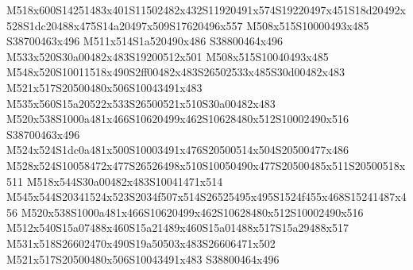 \documentclass{article}
\begin{document}
\begin{multicols}{2}
M518x600S14251483x401S11502482x432S11920491x574S19220497x451S18d20492x528S1dc20488x475S14a20497x509S17620496x557 M508x515S10000493x485 S38700463x496 M511x514S1a520490x486 S38800464x496 M533x520S30a00482x483S19200512x501 M508x515S10040493x485 M548x520S10011518x490S2ff00482x483S26502533x485S30d00482x483 M521x517S20500480x506S10043491x483 M535x560S15a20522x533S26500521x510S30a00482x483 M520x538S1000a481x466S10620499x462S10628480x512S10002490x516 S38700463x496 M524x524S1dc0a481x500S10003491x476S20500514x504S20500477x486 M528x524S10058472x477S26526498x510S10050490x477S20500485x511S20500518x511 M518x544S30a00482x483S10041471x514 M545x544S20341524x523S2034f507x514S26525495x495S1524f455x468S15241487x456 M520x538S1000a481x466S10620499x462S10628480x512S10002490x516 M512x540S15a07488x460S15a21489x460S15a01488x517S15a29488x517 M531x518S26602470x490S19a50503x483S26606471x502 M521x517S20500480x506S10043491x483 S38800464x496









\end{multicols}
\end{document}
